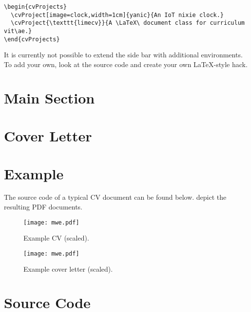 \documentclass{ltxdoc}
\begin{document}
  \begin{lstlisting}
\begin{cvProjects}
  \cvProject[image=clock,width=1cm]{yanic}{An IoT nixie clock.}
  \cvProject{\texttt{limecv}}{A \LaTeX\ document class for curriculum vit\ae.}
\end{cvProjects}
  \end{lstlisting}
  
  It is currently not possible to extend the side bar with additional environments. To add your own, look at the source code and create your own \LaTeX-style hack.  

\section{Main Section}

\section{Cover Letter}

\section{Example}

  The source code of a typical CV document can be found below.  depict the resulting PDF documents.

  \begin{figure}[!ht]
    \texttt{[image: mwe.pdf]}
    \caption{Example CV (scaled).}
    \label{example-cv}
  \end{figure}

  \begin{figure}[!ht]
    \texttt{[image: mwe.pdf]}
    \caption{Example cover letter (scaled).}
    \label{example-cover-letter}
  \end{figure}

  

\section{Source Code}


\end{document}
